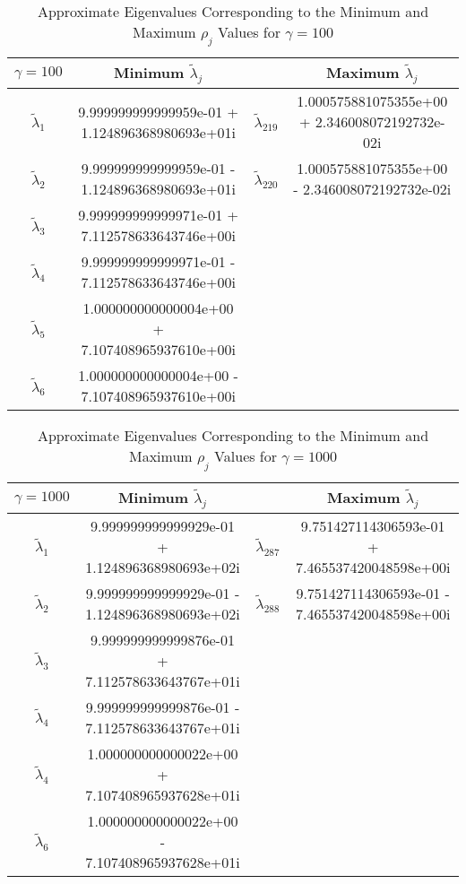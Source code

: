\documentclass[12pt]{article}
\begin{document}
\begin{table}[H]
\renewcommand{\arraystretch}{1.5}
\begin{small}
\hspace{-.95in}
\begin{tabular}{| c | c || c | c |}
\hline
$\gamma = 100$ &  \textbf{Minimum $\tilde{\lambda}_j$} &   &  \textbf{Maximum $\tilde{\lambda}_j$} \\
\hline 
\hline
$\tilde{\lambda}_1$ & 9.999999999999959e-01 + 1.124896368980693e+01i  & $\tilde{\lambda}_{219}$ & 1.000575881075355e+00 + 2.346008072192732e-02i  \\
$\tilde{\lambda}_2$ & 9.999999999999959e-01 - 1.124896368980693e+01i  & $\tilde{\lambda}_{220}$ &  1.000575881075355e+00 - 2.346008072192732e-02i \\
$\tilde{\lambda}_3$ & 9.999999999999971e-01 + 7.112578633643746e+00i  &  &   \\
$\tilde{\lambda}_4$ & 9.999999999999971e-01 - 7.112578633643746e+00i  &  &   \\
$\tilde{\lambda}_5$ & 1.000000000000004e+00 + 7.107408965937610e+00i  &  &   \\
$\tilde{\lambda}_6$ & 1.000000000000004e+00 - 7.107408965937610e+00i  &  &   \\
\hline
\end{tabular}
\end{small}
\caption{Approximate Eigenvalues Corresponding to the Minimum and Maximum $\rho_j$ Values for $\gamma = 100$}
\end{table} 

\begin{table}[H]
\renewcommand{\arraystretch}{1.5}
\begin{small}
\hspace{-.99in}
\begin{tabular}{| c | c || c | c |}
\hline
$\gamma = 1000$ &  \textbf{Minimum $\tilde{\lambda}_j$} &   &  \textbf{Maximum $\tilde{\lambda}_j$} \\
\hline 
\hline
$\tilde{\lambda}_1$ & 9.999999999999929e-01 + 1.124896368980693e+02i  & $\tilde{\lambda}_{287}$ & 9.751427114306593e-01 + 7.465537420048598e+00i  \\
$\tilde{\lambda}_2$ & 9.999999999999929e-01 - 1.124896368980693e+02i  & $\tilde{\lambda}_{288}$ &  9.751427114306593e-01 - 7.465537420048598e+00i \\
$\tilde{\lambda}_3$ & 9.999999999999876e-01 + 7.112578633643767e+01i  &  &   \\
$\tilde{\lambda}_4$ & 9.999999999999876e-01 - 7.112578633643767e+01i  &  &   \\
$\tilde{\lambda}_4$ & 1.000000000000022e+00 + 7.107408965937628e+01i  &  &   \\
$\tilde{\lambda}_6$ &  1.000000000000022e+00 - 7.107408965937628e+01i
 &  &   \\
\hline
\end{tabular}
\end{small}
\caption{Approximate Eigenvalues Corresponding to the Minimum and Maximum $\rho_j$ Values for $\gamma = 1000$}
\end{table} 
\end{document}
